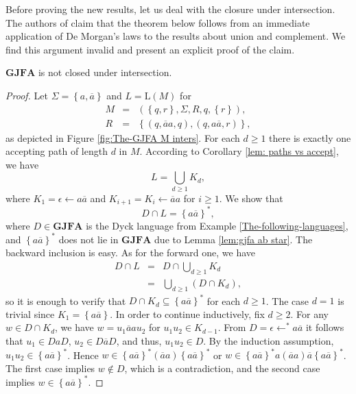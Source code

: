 \documentclass{ws-ijmpc}
\begin{document}
Before proving the new results, let us deal with the closure under
intersection. The authors of \citep{athMED1,athMED1book} claim that
the theorem below follows from an immediate application of De Morgan's
laws to the results about union and complement. We find this argument
invalid and present an explicit proof of the claim.
\begin{theorem}
\label{inters}$\mathbf{GJFA}$ is not closed under intersection.\end{theorem}
\begin{proof}
Let $\Sigma=\left\{ a,\overline{a}\right\} $ and $L=\mathrm{L}\!\left(M\right)$
for 
\begin{eqnarray*}
M & = & \left(\left\{ q,r\right\} ,\Sigma,R,q,\left\{ r\right\} \right),\\
R & = & \left\{ \left(q,\overline{a}a,q\right),\left(q,a\overline{a},r\right)\right\} ,
\end{eqnarray*}
as depicted in Figure \ref{fig:The-GJFA M inters}. For each $d\ge1$
there is exactly one accepting path of length $d$ in $M$. According
to Corollary \ref{lem: paths vs accept}, we have 
\[
L=\bigcup_{d\ge1}K_{d},
\]
where $K_{1}=\epsilon\leftarrow a\overline{a}$ and $K_{i+1}=K_{i}\leftarrow\overline{a}a$
for $i\ge1$. We show that 
\begin{equation}
D\cap L=\left\{ a\overline{a}\right\} ^{*},\label{eq: intersection}
\end{equation}
where $D\in\mathbf{GJFA}$ is the Dyck language from Example \ref{The-following-languages},
and $\left\{ a\overline{a}\right\} ^{*}$ does not lie in\textbf{
$\mathbf{GJFA}$} due to Lemma \ref{lem:gjfa ab star}. The backward
inclusion is easy. As for the forward one, we have 
\begin{eqnarray*}
D\cap L & = & D\cap\bigcup_{d\ge1}K_{d}\\
 & = & \bigcup_{d\ge1}\left(D\cap K_{d}\right),
\end{eqnarray*}
so it is enough to verify that $D\cap K_{d}\subseteq\left\{ a\overline{a}\right\} ^{*}$
for each $d\ge1$. The case $d=1$ is trivial since $K_{1}=\left\{ a\overline{a}\right\} $.
In order to continue inductively, fix $d\ge2$. For any $w\in D\cap K_{d}$,
we have $w=u_{1}\overline{a}au_{2}$ for $u_{1}u_{2}\in K_{d-1}$.
From $D=\epsilon\leftarrow^{*}a\overline{a}$ it follows that $u_{1}\in DaD$,
$u_{2}\in D\overline{a}D$, and thus, $u_{1}u_{2}\in D$. By the induction
assumption, $u_{1}u_{2}\in\left\{ a\overline{a}\right\} ^{*}$. Hence
$w\in\left\{ a\overline{a}\right\} ^{*}\left(\overline{a}a\right)\left\{ a\overline{a}\right\} ^{*}$
or $w\in\left\{ a\overline{a}\right\} ^{*}a\left(\overline{a}a\right)\overline{a}\left\{ a\overline{a}\right\} ^{*}$.
The first case implies $w\notin D$, which is a contradiction, and
the second case implies $w\in\left\{ a\overline{a}\right\} ^{*}$. 
\end{proof}
\end{document}
